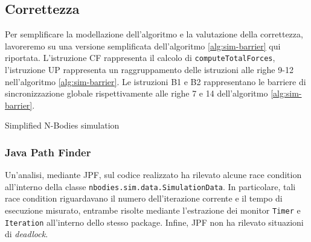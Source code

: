 \documentclass[12pt,a4paper,oneside]{article}
\begin{document}
	\subsection{Correttezza}
	\hfill
	\begin{minipage}{.55\textwidth}
		Per semplificare la modellazione dell'algoritmo e la valutazione della correttezza, lavoreremo su una versione semplificata dell'algoritmo \ref{alg:sim-barrier} qui riportata. L'istruzione CF rappresenta il calcolo di \texttt{computeTotalForces}, l'istruzione UP rappresenta un raggruppamento delle istruzioni alle righe 9-12 nell'algoritmo \ref{alg:sim-barrier}. Le istruzioni B1 e B2 rappresentano le barriere di sincronizzazione globale rispettivamente alle righe 7 e 14 dell'algoritmo \ref{alg:sim-barrier}.
	\end{minipage}
	\hfill
	\begin{minipage}{.4\textwidth}
		\begin{algorithm}[H]
			\caption{Simplified N-Bodies simulation}
		\end{algorithm}
	\end{minipage}
	\hfill
	
	\subsubsection{Java Path Finder}
	Un'analisi, mediante JPF, sul codice realizzato ha rilevato alcune race condition all'interno della classe \texttt{nbodies.sim.data.SimulationData}. In particolare, tali race condition riguardavano il numero dell'iterazione corrente e il tempo di esecuzione misurato, entrambe risolte mediante l'estrazione dei monitor \texttt{Timer} e \texttt{Iteration} all'interno dello stesso package. Infine, JPF non ha rilevato situazioni di \textit{deadlock}.
	
	\iffalse
\end{document}
